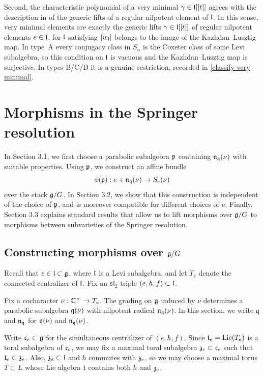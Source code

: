 \documentclass[11pt]{article}
\numberwithin{equation}{section}
\begin{document}
Second, the characteristic polynomial of a very minimal $\gamma\in\mathfrak{l}[[t]]$ agrees with the
description in \cite[Section 6]{Spaltenstein1988PolynomialsLocalFields} of the generic lifts
of a regular nilpotent element of $\mathfrak{l}$. In this sense, very minimal elements are exactly the
generic lifts $\gamma\in\mathfrak{l}[[t]]$ of regular nilpotent elements $e\in\mathfrak{l}$, for $\mathfrak{l}$ satisfying $[w_{\mathfrak{l}}]$ belongs to the image of the Kazhdan--Lusztig map. In type~A every conjugacy class in $S_n$ is the Coxeter class of some Levi subalgebra, so this condition on $\mathfrak{l}$ is vacuous and the Kazhdan--Lusztig map is surjective. In types
B/C/D it is a genuine restriction, recorded in \cref{classify very minimal}.






\section{Morphisms in the Springer resolution}
In Section 3.1, we first choose a parabolic subalgebra $\mathfrak{p}$ containing
$\mathfrak{n}_{\mathfrak{q}}(\nu)$ with suitable properties. Using $\mathfrak{p}$, we construct
an affine bundle
\[
\phi(\mathfrak{p}): e+\mathfrak{n}_{\mathfrak{q}}(\nu)\to S_e(\nu)
\]
over the stack $\mathfrak{g}/G$. In Section 3.2, we show that this construction is independent of the choice
of $\mathfrak{p}$, and is moreover compatible for different choices of $\nu$. Finally, Section 3.3 explains standard results that allow us to lift
morphisms over $\mathfrak{g}/G$ to morphisms between subvarieties of the Springer resolution.

\subsection{Constructing morphisms over $\mathfrak{g}/G$}

Recall that $e\in\mathfrak{l}\subset\mathfrak{g}$, where $\mathfrak{l}$ is a Levi subalgebra,
and let $T_e$ denote the connected centralizer of $\mathfrak{l}$.
Fix an $\mathfrak{sl}_2$-triple $(e,h,f)\subset\mathfrak{l}$.

Fix a cocharacter $\nu:\mathbb{C}^\times\to T_e$. The grading on
$\mathfrak{g}$ induced by $\nu$ determines a parabolic subalgebra $\mathfrak{q}(\nu)$
with nilpotent radical $\mathfrak{n}_{\mathfrak{q}}(\nu)$. In this section, we write
$\mathfrak{q}$ and $\mathfrak{n}_{\mathfrak{q}}$ for $\mathfrak{q}(\nu)$ and $\mathfrak{n}_{\mathfrak{q}}(\nu)$.

Write $\mathfrak{c}_e\subset\mathfrak{g}$ for the simultaneous centralizer of
$(e,h,f)$. Since $\mathfrak{t}_e=\operatorname{Lie}(T_e)$ is a toral subalgebra of
$\mathfrak{c}_e$, we may fix a maximal toral subalgebra $\mathfrak{z}_e\subset\mathfrak{c}_e$ such that  $\mathfrak{t}_e\subset\mathfrak{z}_e$. Also, $\mathfrak{z}_e\subset\mathfrak{l}$ and $h$ commutes with $\mathfrak{z}_e$, so we may
choose a maximal torus $T\subset L$ whose Lie algebra $\mathfrak{t}$
contains both $h$ and $\mathfrak{z}_e$.
\end{document}
